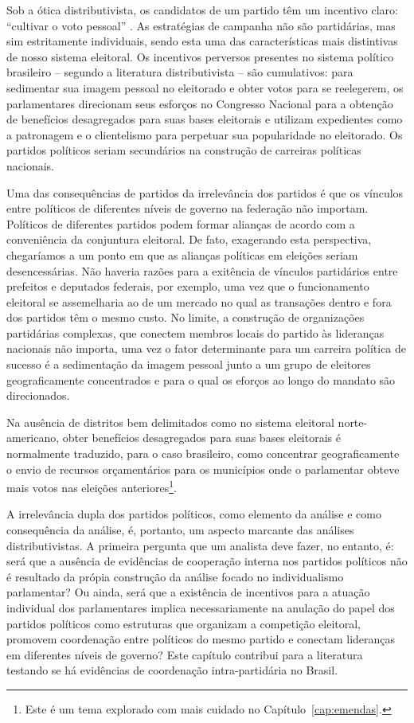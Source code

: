 Sob a ótica distributivista, os candidatos de um partido têm um incentivo claro:  ``cultivar o voto pessoal'' \citep*{Ames1995, Ames1995a, Ames2001, Carey1995, Mainwaring1991, Mainwaring1999}. As estratégias de campanha não são partidárias, mas sim estritamente individuais, sendo esta uma das características mais distintivas de nosso sistema eleitoral. Os incentivos perversos presentes no sistema político brasileiro -- segundo a literatura distributivista -- são cumulativos: para sedimentar sua imagem pessoal no eleitorado e obter votos para se reelegerem, os parlamentares direcionam seus esforços no Congresso Nacional para a obtenção de benefícios desagregados para suas bases eleitorais e utilizam expedientes como a patronagem e o clientelismo para perpetuar sua popularidade no eleitorado. Os partidos políticos seriam secundários na construção de carreiras políticas nacionais.

Uma das consequências de partidos da irrelevância dos partidos é que os vínculos entre políticos de diferentes níveis de governo na federação não importam. Políticos de diferentes partidos podem formar alianças de acordo com a conveniência da conjuntura eleitoral. De fato, exagerando esta perspectiva, chegaríamos a um ponto em que as alianças políticas em eleições seriam desencessárias. Não haveria razões para a exitência de vínculos partidários entre prefeitos e deputados federais, por exemplo, uma vez que o funcionamento eleitoral se assemelharia ao de um mercado no qual as transações dentro e fora dos partidos têm o mesmo custo. No limite, a construção de organizações partidárias complexas, que conectem membros locais do partido às lideranças nacionais não importa, uma vez o fator determinante para um carreira política de sucesso é a sedimentação da imagem pessoal junto a um grupo de eleitores geograficamente concentrados e para o qual os eforços ao longo do mandato são direcionados.

Na ausência de distritos bem delimitados como no sistema eleitoral norte-americano, obter benefícios desagregados para suas bases eleitorais é normalmente traduzido, para o caso brasileiro, como concentrar geograficamente o envio de recursos orçamentários para os municípios onde o parlamentar obteve mais votos nas eleições anteriores\footnote{Este é um tema explorado com mais cuidado no Capítulo~\ref{cap:emendas}.}.

A irrelevância dupla dos partidos políticos, como elemento da análise e como consequência da análise, é, portanto, um aspecto marcante das análises distributivistas. A primeira pergunta que um analista deve fazer, no entanto, é: será que a ausência de evidências de cooperação interna nos partidos políticos não é resultado da própia construção da análise focado no individualismo parlamentar? Ou ainda, será que a existência de incentivos para a atuação individual dos parlamentares implica necessariamente na anulação do papel dos partidos políticos como estruturas que organizam a competição eleitoral, promovem coordenação entre políticos do mesmo partido e conectam lideranças em diferentes níveis de governo? Este capítulo contribui para a literatura testando se há evidências de coordenação intra-partidária no Brasil.

